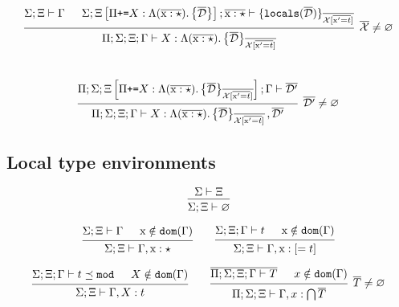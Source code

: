 \documentclass[12pt]{article}
\newcommand{\tx}{\text{\rm x}}
\newcommand{\BX}{\ensuremath{\mathcal{X}}}
\newcommand{\emptyenv}{\varnothing}
\newcommand{\Gammatop}{\ensuremath{\Xi}}
\newcommand{\Gammabot}{\ensuremath{\Gamma}}
\newcommand{\dom}{\texttt{dom}}
\newcommand{\locals}{\texttt{locals}}
\renewcommand{\mod}{\texttt{mod}}
\begin{document}
\[
    \begin{prooftree}
        \hypo { \Sigma; \Gammatop \vdash \Gammabot }
        \hypo { \Sigma; \Gammatop\left[\Pi \texttt{+=} X : \Lambda (\overline{\tx : \star}). \left\{ \overline{\mathcal{D}}\right\}\right]; \overline{\tx : \star} \vdash \{ \locals( \overline{\mathcal{D}})\}_{\overline{\BX[\overline{\tx' = t}]}} }
        \infer2[$\overline{\BX} \neq \emptyenv$]{ \Pi; \Sigma; \Gammatop; \Gammabot \vdash X : \Moddecl }
    \end{prooftree}
\] \\

\[
    \begin{prooftree}
        \hypo { \Pi; \Sigma; \Gammatop\left[\Pi \texttt{+=} X : \Moddecl\right]; \Gammabot \vdash \overline{\mathcal{D}'} }
        \infer1 [$\overline{\mathcal{D}'} \neq \emptyenv$]{ \Pi; \Sigma; \Gammatop; \Gammabot \vdash X : \Moddecl, \overline{\mathcal{D}'} }
    \end{prooftree}
\]


\subsection{Local type environments}

\[
    \begin{prooftree}
        \hypo{ \Sigma \vdash \Gammatop}
        \infer1{ \Sigma; \Gammatop \vdash \emptyenv }
    \end{prooftree}
\]

\[
    \begin{prooftree}
        \hypo{ \Sigma; \Gammatop \vdash \Gammabot }
        \hypo{ \tx \notin \dom(\Gammabot) }
        \infer2{ \Sigma; \Gammatop \vdash \Gammabot, \tx : \star }
    \end{prooftree}
    \qquad
    \begin{prooftree}
        \hypo{ \Sigma; \Gammatop; \Gammabot \vdash t }
        \hypo{ \tx \notin \dom(\Gammabot) }
        \infer2{ \Sigma; \Gammatop \vdash \Gammabot, \tx : [= t] }
    \end{prooftree}
\]

\[
    \begin{prooftree}
        \hypo{ \Sigma; \Gammatop; \Gammabot \vdash t \preceq \mod }
        \hypo{ X \notin \dom(\Gammabot) }
        \infer2{ \Sigma; \Gammatop \vdash \Gammabot, X : t }
    \end{prooftree}
    \qquad
    \begin{prooftree}
        \hypo{ \overline{\Pi; \Sigma; \Gammatop; \Gammabot \vdash T} }
        \hypo{ x \notin \dom(\Gammabot) }
        \infer2[$\overline{T} \neq \emptyenv$]{ \Pi; \Sigma; \Gammatop \vdash \Gammabot, x : \bigcap \overline{T} }
    \end{prooftree}
\] \\
\end{document}

